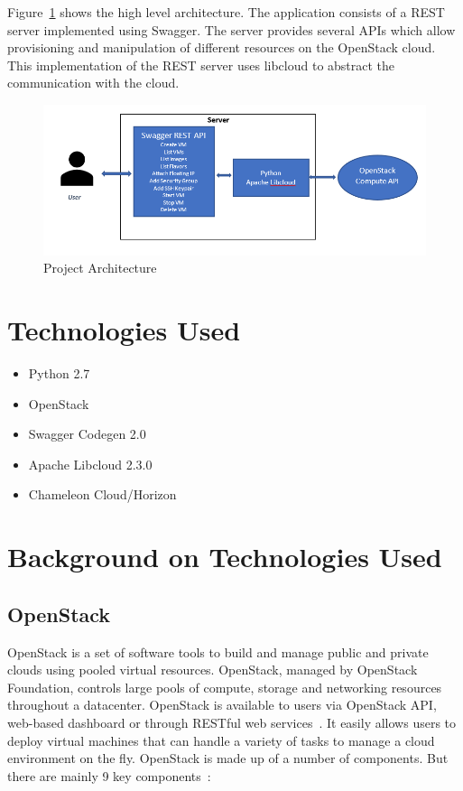 Figure~\ref{fig:project-architecture} shows the high level architecture. The 
application consists of a REST server implemented using Swagger. The server
provides several APIs which allow provisioning and manipulation of different
resources on the OpenStack cloud. This implementation of the REST server uses 
libcloud to abstract the communication with the cloud. 

\begin{figure}[!ht]
        \centering\includegraphics[width=\columnwidth]
        {images/proj-architecture.PNG}
        \caption{Project Architecture}\label{fig:project-architecture}
\end{figure}

\section{Technologies Used}
\begin{itemize}
\item Python 2.7
\item OpenStack 
\item Swagger Codegen 2.0
\item Apache Libcloud 2.3.0
\item Chameleon Cloud/Horizon
\end{itemize}

\section{Background on Technologies Used}

\subsection{OpenStack}
OpenStack is a set of software tools to build and manage public and private
clouds using pooled virtual resources. OpenStack, managed by OpenStack
Foundation, controls large pools of compute, storage and networking resources
throughout a datacenter. OpenStack is available to users via OpenStack API,
web-based dashboard or through RESTful web
services~\cite{hid-sp18-516-www-wiki-openstack}. It easily allows users to
deploy virtual machines that can handle a variety of tasks to manage a cloud
environment on the fly. OpenStack is made up of a number of components. But
there are mainly 9 key components~\cite{hid-sp18-516-www-opensource}:

